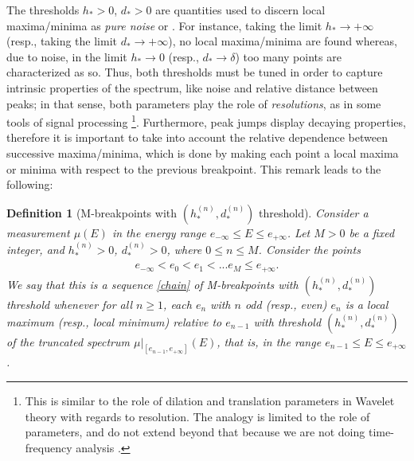 \documentclass[%
 reprint,
 amsmath,amssymb,
 aps,
]{revtex4-1}
\newtheorem{Definition}[Lemma]{Definition}
\begin{document}
The thresholds  $h_*>0$, $d_*>0$ are quantities used to discern local maxima/minima as \textit{pure noise} or . For instance,  taking the limit $h_* \to +\infty$ (resp., taking the limit $d_*\to  +\infty$), no local maxima/minima are found whereas, due to noise, in the limit $h_* \to 0$ (resp., $d_*\to \delta$) too many points are characterized as so. Thus, both thresholds must be tuned in order to capture intrinsic properties of the spectrum, like noise and relative distance between peaks; in that sense, both parameters play the role of \textit{resolutions}, as in some tools of signal processing \footnote{This is similar to the role of dilation and translation parameters in Wavelet theory with regards to resolution. The analogy is limited to the role of parameters, and do not extend beyond that because we are not doing time-frequency analysis \cite{Mallat,Lectures}. }. Furthermore, peak jumps display decaying properties, therefore it is important to take into account the relative dependence between successive maxima/minima, which is done by making each point a local maxima or minima with respect to the previous breakpoint. This remark leads to the following:

\begin{Definition}[M-breakpoints with $(h_*^{(n)},d_*^{(n)})$ threshold] \label{def:min_max_2}
Consider a  measurement $\mu(E)$ in the energy range $e_{-\infty}\leq E\leq e_{+\infty}$. Let $M >0$ be a fixed integer,  and $h_*^{(n)}>0$, $d_*^{(n)}>0$, where $0\leq n \leq M$. Consider the points 
 \begin{align}\label{chain}
  e_{-\infty} < e_0 <e_1 <... e_M \leq e_{+\infty}.
 \end{align}
%
We say that this is a  sequence \eqref{chain} of M-breakpoints with $(h_*^{(n)},d_*^{(n)})$ threshold whenever for all $n \geq1$, each $e_n$ with $n$ odd (resp., even) $e_n$ is a  local maximum (resp., local minimum) relative  to $e_{n-1}$ with threshold $(h_*^{(n)},d_*^{(n)})$ of the truncated spectrum $\mu\Big\vert_{[e_{n-1},e_{+\infty}]}(E)$, that is,  in the range $e_{n-1}\leq E\leq e_{+\infty}$.
\end{Definition}
\end{document}
